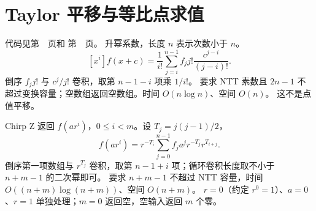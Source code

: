 \clearpage
\section{Taylor 平移与等比点求值}\label{knowledge-poly-shift}
代码见第~\pageref{compact-polynomial_shift}~页和
第~\pageref{compact-chirp_z}~页。
升幂系数，长度 $n$ 表示次数小于 $n$。
\[
 [x^i]f(x+c)=\frac1{i!}\sum_{j=i}^{n-1} f_jj!\frac{c^{j-i}}{(j-i)!}.
\]
倒序 $f_jj!$ 与 $c^j/j!$ 卷积，取第 $n-1-i$ 项乘 $1/i!$。
要求 NTT 素数且 $2n-1$ 不超过变换容量；空数组返回空数组。时间 $O(n\log n)$、空间 $O(n)$。
这不是点值平移。

Chirp Z 返回 $f(ar^i)$，$0\le i<m$。设 $T_j=j(j-1)/2$，
\[
 f(ar^i)=r^{-T_i}\sum_{j=0}^{n-1}
        f_ja^jr^{-T_j}r^{T_{i+j}}.
\]
倒序第一项数组与 $r^{T_j}$ 卷积，取第 $n-1+i$ 项；循环卷积长度取不小于 $n+m-1$ 的二次幂即可。
要求 $n+m-1$ 不超过 NTT 容量，时间 $O((n+m)\log(n+m))$、空间 $O(n+m)$。
$r=0$（约定 $r^0=1$）、$a=0$、$r=1$ 单独处理；$m=0$ 返回空，空输入返回 $m$ 个零。

\clearpage
